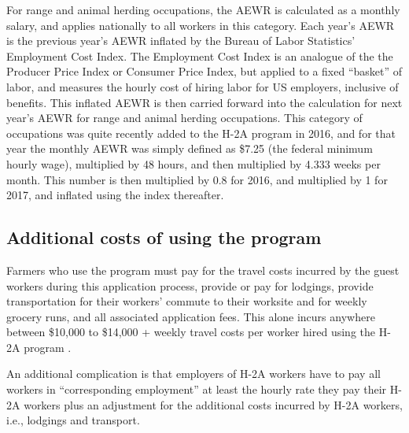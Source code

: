 \documentclass[14pt]{article}
\begin{document}
For range and animal herding occupations, the AEWR is calculated as a monthly salary, and applies nationally to all workers in this category.
Each year's AEWR is the previous year's AEWR inflated by the Bureau of Labor Statistics' Employment Cost Index.
The Employment Cost Index is an analogue of the the Producer Price Index or Consumer Price Index, but applied to a fixed ``basket'' of labor, and measures the hourly cost of hiring labor for US employers, inclusive of benefits.
This inflated AEWR is then carried forward into the calculation for next year's AEWR for range and animal herding occupations.
This category of occupations was quite recently added to the H-2A program in 2016, and for that year the monthly AEWR was simply defined as \$7.25 (the federal minimum hourly wage), multiplied by 48 hours, and then multiplied by 4.333 weeks per month.
This number is then multiplied by 0.8 for 2016, and multiplied by 1 for 2017, and inflated using the index thereafter.

\subsection{Additional costs of using the program}

Farmers who use the program must pay for the travel costs incurred by the guest workers during this application process, provide or pay for lodgings, provide transportation for their workers' commute to their worksite and for weekly grocery runs, and all associated application fees.
This alone incurs anywhere between \$10,000 to \$14,000 + weekly travel costs per worker hired using the H-2A program \parencite{usda_h2a_info}.

An additional complication is that employers of H-2A workers have to pay all workers in ``corresponding employment'' at least the hourly rate they pay their H-2A workers plus an adjustment for the additional costs incurred by H-2A workers, i.e., lodgings and transport.
\end{document}
